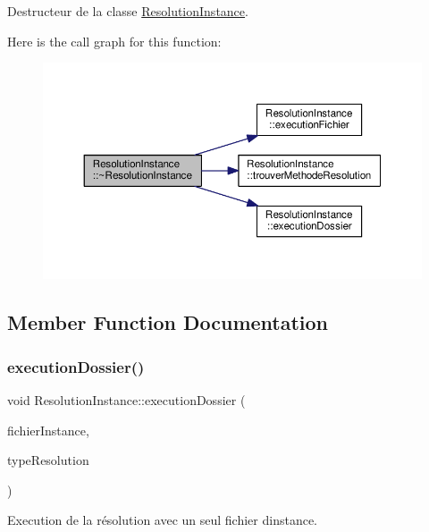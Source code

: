 Destructeur de la classe \hyperlink{classResolutionInstance}{Resolution\+Instance}. 

Here is the call graph for this function\+:\nopagebreak
\begin{figure}[H]
\begin{center}
\leavevmode
\includegraphics[width=350pt]{classResolutionInstance_acbc867c1e869aafcb0c20a5698e00aee_cgraph}
\end{center}
\end{figure}


\subsection{Member Function Documentation}
\mbox{\label{classResolutionInstance_aa4184555e523d745accf570986f6fe45}} 
\subsubsection{\texorpdfstring{execution\+Dossier()}{executionDossier()}}
{\footnotesize\ttfamily void Resolution\+Instance\+::execution\+Dossier (\begin{DoxyParamCaption}\item[{Q\+String}]{fichier\+Instance,  }\item[{Q\+String}]{type\+Resolution }\end{DoxyParamCaption})}



Execution de la résolution avec un seul fichier d\textquotesingle{}instance. 


